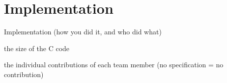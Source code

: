 \documentclass[final]{article}
\begin{document}
\section{Implementation}
Implementation (how you did it, and who did what)

the size of the C code

the individual contributions of each team member (no specification = no contribution)
\end{document}

